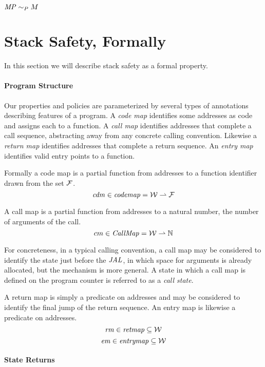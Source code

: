 \documentclass[acmsmall,review,anonymous]{acmart}\settopmatter{printfolios=true,printccs=false,printacmref=false}
\begin{document}
            {\(\mathit{MP} \sim_P M\)}

\section{Stack Safety, Formally}

In this section we will describe stack safety as a formal
property.

\paragraph*{Program Structure}

  Our properties and policies are parameterized by several types of annotations
  describing features of a program. A {\em code map} identifies some addresses
  as code and assigns each to a function. A {\em call map} identifies addresses
  that complete a call sequence, abstracting away from any concrete calling
  convention. Likewise a {\em return map} identifies addresses that complete a
  return sequence. An {\em entry map} identifies valid entry points to a
  function.

  Formally a code map is a partial function from addresses to a function
  identifier drawn from the set \(\mathcal{F}\).
  \[\mathit{cdm} \in \mathit{codemap} = {\mathcal W} \rightharpoonup \mathcal{F}\]

  A call map is a partial function from addresses to a natural number,
  the number of arguments of the call.
  \[cm \in \mathit{CallMap} = {\mathcal W} \rightharpoonup \mathbb{N}\]

  For concreteness, in a typical calling convention, a call map may be
  considered to identify the state just before the \(\mathit{JAL}\), in which
  space for arguments is already allocated, but the mechanism is more
  general. A state in which a call map is defined on the program counter is
  referred to as a {\it call state}.
  
  A return map is simply a predicate on addresses and may be considered to
  identify the final jump of the return sequence. An entry map is likewise a
  predicate on addresses.
  \[\mathit{rm} \in \mathit{retmap} \subseteq {\mathcal W}\]
  \[\mathit{em} \in \mathit{entrymap} \subseteq {\mathcal W}\]

\paragraph*{State Returns}
\end{document}
